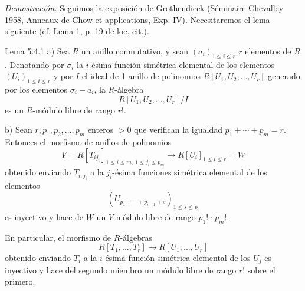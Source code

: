 \emph{Demostración.} Seguimos la exposición de Grothendieck (Séminaire Chevalley 1958, Anneaux de Chow et applications, Exp. IV). Necesitaremos el lema siguiente (cf. Lema 1, p. 19 de loc. cit.).

\begin{statement}{Lema 5.4.1}
a) Sea $R$ un anillo conmutativo, y sean $(a_i)_{1\le i\le r}$ $r$ elementos de $R$. Denotando por $\sigma_i$ la $i$-ésima función simétrica elemental de los elementos $(U_i)_{1\le i\le r}$ y por $I$ el ideal de 1 anillo de polinomios $R[U_1,U_2,\ldots,U_r]$ generado por los elementos $\sigma_i-a_i$, la $R$-álgebra
\[
R[U_1,U_2,\ldots,U_r]/I
\]
es un $R$-módulo libre de rango $r!$.

b) Sean $r,p_1,p_2,\ldots,p_m$ enteros $>0$ que verifican la igualdad $p_1+\cdots+p_m=r$. Entonces el morfismo de anillos de polinomios
\[
V=R[T_{ij_i}]_{1\le i\le m,\,1\le j_i\le p_m}
\longrightarrow R[U_i]_{1\le i\le r}=W
\]
obtenido enviando $T_{i,j_i}$ a la $j_i$-ésima funciones simétrica elemental de los elementos
\[
(U_{p_1+\cdots+p_{i-1}+s})_{1\le s\le p_i}
\]
es inyectivo y hace de $W$ un $V$-módulo libre de rango $p_1!\cdots p_m!$.

En particular, el morfismo de $R$-álgebras
\[
R[T_1,\ldots,T_r]\to R[U_1,\ldots,U_r]
\]
obtenido enviando $T_i$ a la $i$-ésima función simétrica elemental de los $U_j$ es inyectivo y hace del segundo miembro un módulo libre de rango $r!$ sobre el primero.
\end{statement}

